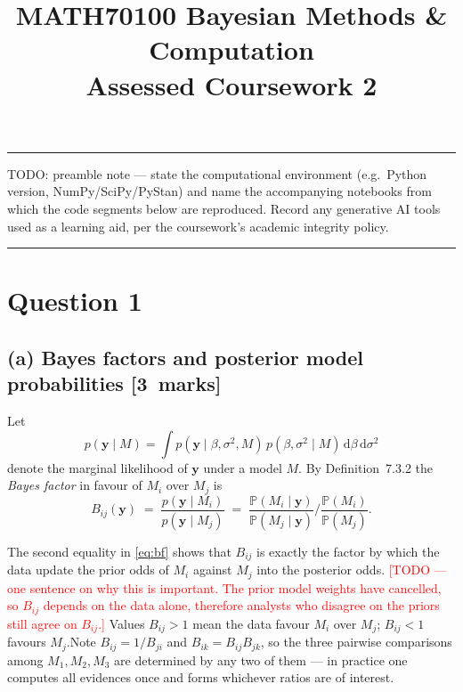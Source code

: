 \documentclass[11pt,a4paper]{article}
\title{\vspace{-1.4cm}\textbf{MATH70100 Bayesian Methods \& Computation}\\[4pt]
       \large Assessed Coursework 2}
\date{}
\newcommand{\y}{\bm{y}}
\newcommand{\Prob}{\mathbb{P}}
\newcommand{\partmarks}[1]{\hfill\normalfont\mbox{[#1 marks]}}
\begin{document}
\maketitle
\vspace{-1.6cm}

\noindent\rule{\textwidth}{0.4pt}
\vspace{2pt}

\noindent
TODO: preamble note --- state the computational environment (e.g.\ Python version, NumPy/SciPy/PyStan)
and name the accompanying notebooks from which the code segments below are reproduced. Record any
generative AI tools used as a learning aid, per the coursework's academic integrity policy.

\vspace{4pt}
\noindent\rule{\textwidth}{0.4pt}

\section*{Question 1}

\subsection*{(a) Bayes factors and posterior model probabilities \partmarks{3}}

Let
\begin{equation}
  p(\y \mid M) = \int p(\y \mid \beta,\sigma^2,M)\, p(\beta,\sigma^2\mid M)\,
  \mathrm d\beta\,\mathrm d\sigma^2
  \label{eq:marglik}
\end{equation}
denote the marginal likelihood of $\y$ under a model $M$. By
Definition~7.3.2 the \emph{Bayes factor} in favour of $M_i$ over $M_j$ is
\begin{equation}
B_{ij}(\y) \;=\; \frac{p(\y\mid M_i)}{p(\y\mid M_j)}
\;=\; \frac{\Prob(M_i\mid \y)}{\Prob(M_j\mid \y)}\Bigg/\frac{\Prob(M_i)}{\Prob(M_j)} .
\label{eq:bf}
\end{equation}

The second equality in \eqref{eq:bf} shows that $B_{ij}$ is exactly the factor by which the
data update the prior odds of $M_i$ against $M_j$ into the posterior odds.
\textcolor{red}{[TODO --- one sentence on why this is important. The prior model weights have
cancelled, so $B_{ij}$ depends on the data alone, therefore analysts who disagree on the priors still
agree on $B_{ij}$.]}
Values $B_{ij}>1$ mean the data favour $M_i$ over $M_j$; $B_{ij}<1$ favours $M_j$.Note
$B_{ij}=1/B_{ji}$ and $B_{ik}=B_{ij}B_{jk}$, so the three pairwise comparisons among
$M_1,M_2,M_3$ are determined by any two of them --- in practice one computes all evidences
once and forms whichever ratios are of interest.
\end{document}
